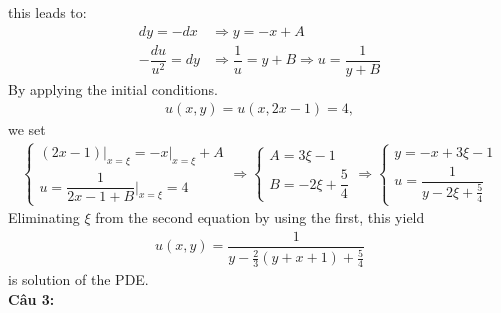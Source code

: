 \documentclass{article}
\newcommand{\dps}{\displaystyle}
\newcommand{\f}[2]{\dfrac{#1}{#2}}
\newcommand{\at}[2]{\bigg\rvert_{#1}^{#2} }
\begin{document}
this leads to:
\begin{align*}
	dy = - dx           & \Rightarrow y = -x + A                                    \\
	-\f{du}{u^{2}} = dy & \Rightarrow \f{1}{u} = y + B \Rightarrow u = \f{1}{y + B}
\end{align*}
By applying the initial conditions.
\begin{align*}
	u(x,y) = u(x,2x - 1) = 4,
\end{align*}
we set
\begin{align*}
	\begin{cases}
		(2x - 1)\at{x = \xi}{} = - x \at{x = \xi}{} + A \\
		u = \f{1}{2x - 1 + B} \at{x = \xi}{} = 4
	\end{cases}
	\Rightarrow
	\begin{cases}
		A = 3 \xi - 1 \\
		B = -2\xi + \f{5}{4}
	\end{cases}
	\Rightarrow
	\begin{cases}
		y = - x + 3\xi - 1 \\
		u = \f{1}{y - 2\xi + \frac{5}{4}}
	\end{cases}
\end{align*}
Eliminating $\xi$ from the second equation by using the first, this yield
\begin{align*}
	u(x,y) = \f{1}{y - \frac{2}{3}\left( y + x + 1 \right) + \frac{5}{4}}
\end{align*}
is solution of the PDE.\\
\textbf{Câu 3:}
\end{document}
